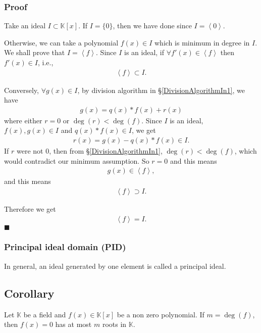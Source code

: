 \documentclass[11pt]{book}
\begin{document}
\subsubsection{Proof}
Take an ideal $I \subset \mathbb{K}[x]$.
If $I = \{ 0 \}$, then we have done since $I = \left< 0 \right>$.

Otherwise, we can take a polynomial $f(x) \in I$ which is minimum in degree in $I$.
We shall prove that $I = \left< f \right>$.
Since $I$ is an ideal, if $\forall f'(x) \in \left< f \right>$ then $f'(x) \in I$, i.e.,
\begin{eqnarray}
\left< f \right> \subset I.
\end{eqnarray}

Conversely, $\forall g(x) \in I$, by division algorithm in \S\ref{DivisionAlgorithmIn1}, we have
\begin{eqnarray}
g(x) = q(x)*f(x) + r(x)
\end{eqnarray}
where either $r=0$ or $\deg(r) < \deg(f)$.
Since $I$ is an ideal, $f(x),g(x) \in I$ and $q(x)*f(x) \in I$, we get
\begin{eqnarray}
r(x) = g(x) -q(x)*f(x) \in I.
\end{eqnarray}
If $r$ were not $0$, then from \S\ref{DivisionAlgorithmIn1}, $\deg(r) < \deg(f)$, which would contradict our minimum assumption.
So $r=0$ and this means
\begin{eqnarray}
g(x) \in \left< f \right>,
\end{eqnarray}
and this means
\begin{eqnarray}
\left< f \right> \supset I.
\end{eqnarray}

Therefore we get
\begin{eqnarray}
\left< f \right> = I.
\end{eqnarray}
$\blacksquare$

\subsubsection{Principal ideal domain (PID)}
In general, an ideal generated by one element is called a principal ideal.

\subsection{Corollary}
\label{atMostDeg}
Let $\mathbb{K}$ be a field and $f(x) \in \mathbb{K}[x]$ be a non zero polynomial.
If $m = \deg(f)$, then $f(x) = 0$ has at most $m$ roots in $\mathbb{K}$.
\end{document}
